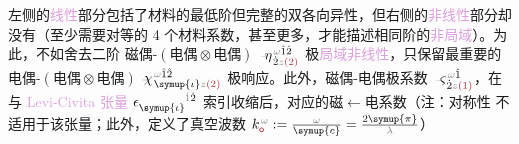  左侧的\textcolor{Plum}{线性}部分包括了材料的最低阶但完整的\textcolor{PineGreen}{双各向异性}\cite{langeMultipoleTheoryHehl2015}，但右侧的\textcolor{Plum}{非线性}部分却没有（至少需要对等的 4 个材料系数，甚至更多，才能描述相同阶的\textcolor{Plum}{非局域}）。为此，不如舍去二阶 \textcolor{NavyBlue}{磁偶-$(\text{电偶}\otimes\text{电偶})$} $\xint{\begin{smallmatrix} ~ \\ {}^{}_{\mathcolor{gray}{-}} \\ ~ \end{smallmatrix}}{17}{\eta}^{\;\! \mathcolor{gray}{\omega} \hat{1} \hat{2}}_{\;\! \dot{2} \mathcolor{gray}{z} \textcolor{Maroon}{(2)}}$ 极\textcolor{Plum}{局域}\textcolor{Plum}{非线性}，只保留最重要的\textcolor{NavyBlue}{电偶-$(\text{电偶}\otimes\text{电偶})$} $\xint{{}^{}_{\mathcolor{gray}{-}}}{23}{\chi}^{\;\! \mathcolor{gray}{\omega} \hat{1} \hat{2}}_{\;\! \symup{\iota} \mathcolor{gray}{z} \textcolor{Maroon}{(2)}}$ 极响应。此外，\textcolor{NavyBlue}{磁偶-电偶}极系数 $\xint{\begin{smallmatrix} ~ \\ {}^{}_{\mathcolor{gray}{-}} \\ ~ \end{smallmatrix}}{13}{\varsigma}^{\;\! \mathcolor{gray}{\omega} \hat{1}}_{\;\! \dot{2} \mathcolor{gray}{z} \textcolor{Maroon}{(1)}}$，在与 \textcolor{Plum}{Levi-Civita 张量} $\epsilon^{\hphantom{\symup{\iota}}\mathcolor{gray}{\dot{1}}\dot{2}}_{\symup{\iota}}$ 索引收缩后，对应的\textcolor{NavyBlue}{磁$\longleftarrow$电}系数（注：对称性  不适用于该张量；此外，定义了\textcolor{PineGreen}{真空波数} $k_{\textcolor{Maroon}{\mathsf{o}}}^{\;\! \mathcolor{gray}{\omega}} := \frac{\mathcolor{gray}{\omega}}{\symup{c}} = \frac{2 \symup{\pi}}{\mathcolor{gray}{\lambda}}$）
\abovedisplayskip=3pt
\belowdisplayskip=5pt
